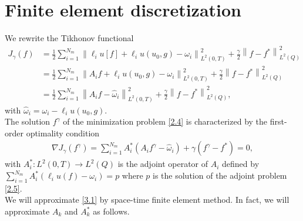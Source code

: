 \documentclass[]{article}
\begin{document}
\section{Finite element discretization}\label{section4}
We rewrite the Tikhonov functional
\begin{align*}
	J_\gamma(f)&=\frac{1}{2}\sum_{i=1}^{N_m}\left\|\ell_i u[f]+\ell_i u(u_0, g)-\omega_i\right\|^2_{L^2(0, T)}+\frac{\gamma}{2}\left\|f-f^*\right\|^2_{L^2(Q)}\\
	&=\frac{1}{2}\sum_{i=1}^{N_m}\left\|A_if+\ell_i u(u_0, g)-\omega_i\right\|^2_{L^2(0, T)}+\frac{\gamma}{2}\left\|f-f^*\right\|^2_{L^2(Q)}\\
	&=\frac{1}{2}\sum_{i=1}^{N_m}\left\|A_if-\hat{\omega}_i\right\|^2_{L^2(0, T)}+\frac{\gamma}{2}\left\|f-f^*\right\|^2_{L^2(Q)},
\end{align*}
with $\hat{\omega}_i=\omega_i-\ell_i u(u_0, g)$.
\\
The solution $f^\gamma$ of the minimization problem \eqref{2.4} is characterized by the first-order optimality condition
\begin{align}\label{3.1}
	\nabla J_\gamma(f^\gamma)= \sum_{i=1}^{N_m}A^*_i(A_if^\gamma-\hat{\omega}_i)+\gamma(f^\gamma-f^*)=0,
\end{align}
with $A_i^*: L^2(0, T)\to L^2(Q)$ is the adjoint operator of $A_i$ defined by $\sum_{i=1}^{N_m}A_i^*\left(\ell_i u(f) - \omega_i\right) = p$ where $p$ is the solution of the adjoint problem \eqref{2.5}. 
\\
We will approximate \eqref{3.1} by space-time finite element method. In fact, we will approximate $A_k$ and $A^*_k$ as follows.
\end{document}
